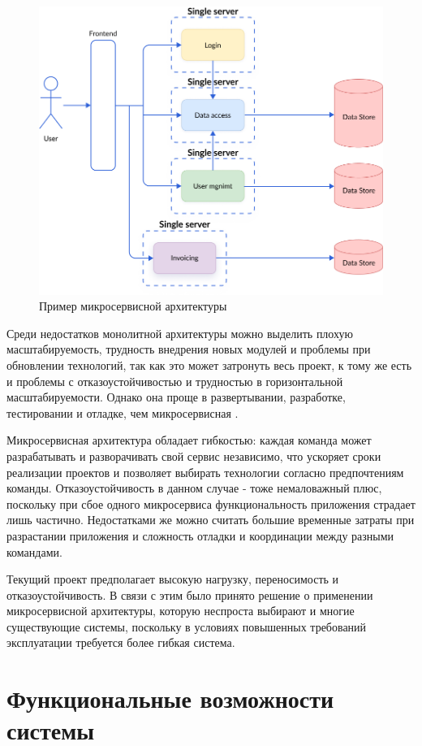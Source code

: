 \begin{figure}
  \centering
  \includegraphics[width=.9\textwidth]{graphics/img/micro.png}
  \caption{Пример микросервисной архитектуры}
  \label{fig:micro}
\end{figure}

Среди недостатков монолитной архитектуры можно выделить плохую масштабируемость, трудность внедрения новых модулей и проблемы при обновлении технологий, так как это может затронуть весь проект, к тому же есть и проблемы с отказоустойчивостью и трудностью в горизонтальной масштабируемости. Однако она проще в развертывании, разработке, тестировании и отладке, чем микросервисная \cite{arch:monovsmicro}. 

Микросервисная архитектура обладает гибкостью: каждая команда может разрабатывать и разворачивать свой сервис независимо, что ускоряет сроки реализации проектов и позволяет выбирать технологии согласно предпочтениям команды. Отказоустойчивость в данном случае - тоже немаловажный плюс, поскольку при сбое одного микросервиса функциональность приложения страдает лишь частично. Недостатками же можно считать большие временные затраты при разрастании приложения и сложность отладки и координации между разными командами. 

Текущий проект предполагает высокую нагрузку, переносимость и отказоустойчивость. В связи с этим было принято решение о применении микросервисной архитектуры, которую неспроста выбирают и многие существующие системы, поскольку в условиях повышенных требований эксплуатации требуется более гибкая система.

\section{Функциональные возможности системы}

